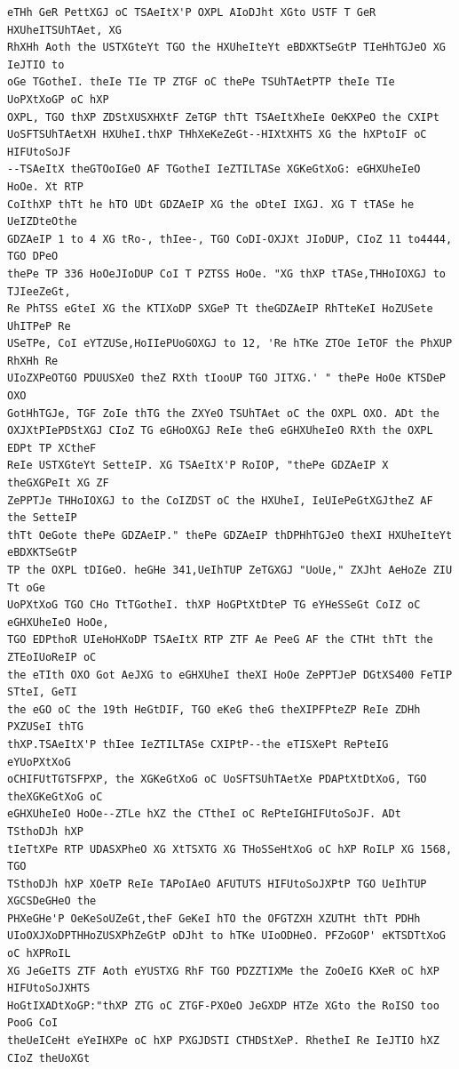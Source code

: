 \documentclass[12pt,a4paper]{article}
\begin{document}
\begin{lstlisting}[caption={Complete text after iteration 3}, label={lst:iter3}]
eTHh GeR PettXGJ oC TSAeItX'P OXPL AIoDJht XGto USTF T GeR HXUheITSUhTAet, XG
RhXHh Aoth the USTXGteYt TGO the HXUheIteYt eBDXKTSeGtP TIeHhTGJeO XG IeJTIO to
oGe TGotheI. theIe TIe TP ZTGF oC thePe TSUhTAetPTP theIe TIe UoPXtXoGP oC hXP
OXPL, TGO thXP ZDStXUSXHXtF ZeTGP thTt TSAeItXheIe OeKXPeO the CXIPt
UoSFTSUhTAetXH HXUheI.thXP THhXeKeZeGt--HIXtXHTS XG the hXPtoIF oC HIFUtoSoJF
--TSAeItX theGTOoIGeO AF TGotheI IeZTILTASe XGKeGtXoG: eGHXUheIeO HoOe. Xt RTP
CoIthXP thTt he hTO UDt GDZAeIP XG the oDteI IXGJ. XG T tTASe he UeIZDteOthe
GDZAeIP 1 to 4 XG tRo-, thIee-, TGO CoDI-OXJXt JIoDUP, CIoZ 11 to4444, TGO DPeO
thePe TP 336 HoOeJIoDUP CoI T PZTSS HoOe. "XG thXP tTASe,THHoIOXGJ to TJIeeZeGt,
Re PhTSS eGteI XG the KTIXoDP SXGeP Tt theGDZAeIP RhTteKeI HoZUSete UhITPeP Re
USeTPe, CoI eYTZUSe,HoIIePUoGOXGJ to 12, 'Re hTKe ZTOe IeTOF the PhXUP RhXHh Re
UIoZXPeOTGO PDUUSXeO theZ RXth tIooUP TGO JITXG.' " thePe HoOe KTSDeP OXO
GotHhTGJe, TGF ZoIe thTG the ZXYeO TSUhTAet oC the OXPL OXO. ADt the
OXJXtPIePDStXGJ CIoZ TG eGHoOXGJ ReIe theG eGHXUheIeO RXth the OXPL EDPt TP XCtheF
ReIe USTXGteYt SetteIP. XG TSAeItX'P RoIOP, "thePe GDZAeIP X theGXGPeIt XG ZF
ZePPTJe THHoIOXGJ to the CoIZDST oC the HXUheI, IeUIePeGtXGJtheZ AF the SetteIP
thTt OeGote thePe GDZAeIP." thePe GDZAeIP thDPHhTGJeO theXI HXUheIteYt eBDXKTSeGtP
TP the OXPL tDIGeO. heGHe 341,UeIhTUP ZeTGXGJ "UoUe," ZXJht AeHoZe ZIU Tt oGe
UoPXtXoG TGO CHo TtTGotheI. thXP HoGPtXtDteP TG eYHeSSeGt CoIZ oC eGHXUheIeO HoOe,
TGO EDPthoR UIeHoHXoDP TSAeItX RTP ZTF Ae PeeG AF the CTHt thTt the ZTEoIUoReIP oC
the eTIth OXO Got AeJXG to eGHXUheI theXI HoOe ZePPTJeP DGtXS400 FeTIP STteI, GeTI
the eGO oC the 19th HeGtDIF, TGO eKeG theG theXIPFPteZP ReIe ZDHh PXZUSeI thTG
thXP.TSAeItX'P thIee IeZTILTASe CXIPtP--the eTISXePt RePteIG eYUoPXtXoG
oCHIFUtTGTSFPXP, the XGKeGtXoG oC UoSFTSUhTAetXe PDAPtXtDtXoG, TGO theXGKeGtXoG oC
eGHXUheIeO HoOe--ZTLe hXZ the CTtheI oC RePteIGHIFUtoSoJF. ADt TSthoDJh hXP
tIeTtXPe RTP UDASXPheO XG XtTSXTG XG THoSSeHtXoG oC hXP RoILP XG 1568, TGO
TSthoDJh hXP XOeTP ReIe TAPoIAeO AFUTUTS HIFUtoSoJXPtP TGO UeIhTUP XGCSDeGHeO the
PHXeGHe'P OeKeSoUZeGt,theF GeKeI hTO the OFGTZXH XZUTHt thTt PDHh
UIoOXJXoDPTHHoZUSXPhZeGtP oDJht to hTKe UIoODHeO. PFZoGOP' eKTSDTtXoG oC hXPRoIL
XG JeGeITS ZTF Aoth eYUSTXG RhF TGO PDZZTIXMe the ZoOeIG KXeR oC hXP HIFUtoSoJXHTS
HoGtIXADtXoGP:"thXP ZTG oC ZTGF-PXOeO JeGXDP HTZe XGto the RoISO too PooG CoI
theUeICeHt eYeIHXPe oC hXP PXGJDSTI CTHDStXeP. RhetheI Re IeJTIO hXZ CIoZ theUoXGt

\end{lstlisting}
\end{document}
